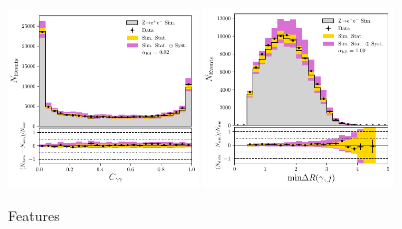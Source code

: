 \begin{figure}[h!]
\begin{center}
    \end{center}
    \begin{center}
        \includegraphics[width=0.45\textwidth]{figures/appendix_zee/centrality_zee_PS.pdf}
        \includegraphics[width=0.45\textwidth]{figures/appendix_zee/min_delta_r_jgam_zee_PS.pdf}
    \end{center}
    \caption{Features}
\end{figure}

